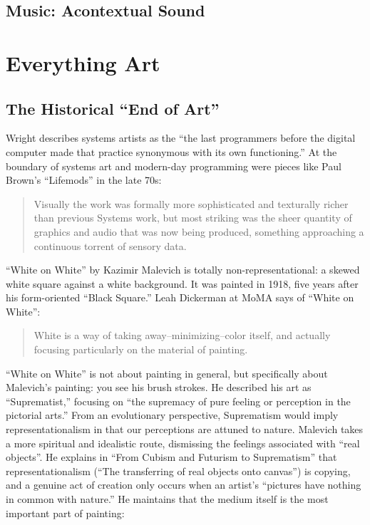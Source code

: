 \documentclass{thesis}
\begin{document}
\section{Music: Acontextual Sound}
	\cite{Bruen04}\cite{Vannort06}\cite{Attali85}\cite{Cage61}\cite{Sangild04}\cite{Cascone00}
	\cite{Hegarty02}\cite{Kahn01}\cite{Russolo04}
	
\chapter{Everything Art}
\section{The Historical ``End of Art''}
	\cite{Wright09}
	Wright describes systems artists as the ``the last programmers before the digital computer made that practice synonymous with its own functioning.'' At the boundary of systems art and modern-day programming were pieces like Paul Brown's ``Lifemods'' in the late 70s:
	
	\begin{quote}
	Visually the work was formally more sophisticated and texturally richer than previous Systems work, but most striking was the sheer quantity of graphics and audio that was now being produced, something approaching a continuous torrent of sensory data.
	\end{quote}
	
	\cite{moma_kazimir_2006}
	``White on White'' by Kazimir Malevich is totally non-representational: a skewed white square against a white background. It was painted in 1918, five years after his form-oriented ``Black Square.'' Leah Dickerman at MoMA says of ``White on White'':
	
	\begin{quote}
	White is a way of taking away--minimizing--color itself, and actually focusing particularly on the material of painting.
	\end{quote}
	
	``White on White'' is not about painting in general, but specifically about Malevich's painting: you see his brush strokes. He described his art as ``Suprematist,'' focusing on ``the supremacy of pure feeling or perception in the pictorial arts.'' From an evolutionary perspective, Suprematism would imply representationalism in that our perceptions are attuned to nature. Malevich takes a more spiritual and idealistic route, dismissing the feelings associated with ``real objects''. He explains in ``From Cubism and Futurism to Suprematism'' that representationalism (``The transferring of real objects onto canvas'') is copying, and a genuine act of creation only occurs when an artist's ``pictures have nothing in common with nature.'' He maintains that the medium itself is the most important part of painting:
	
\end{document}
